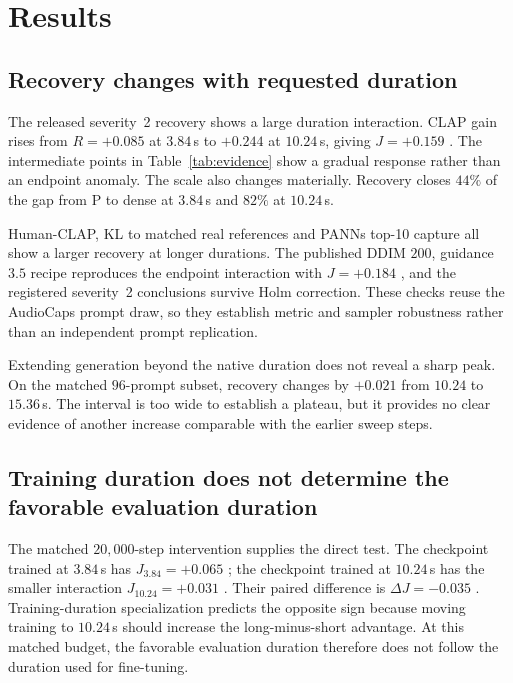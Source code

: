 \section{Results}
\subsection{Recovery changes with requested duration}
The released severity~2 recovery shows a large duration interaction. CLAP gain rises from $R=+0.085$  at $3.84$\,s to $+0.244$  at $10.24$\,s, giving $J=+0.159$ . The intermediate points in Table~\ref{tab:evidence} show a gradual response rather than an endpoint anomaly. The scale also changes materially. Recovery closes $44\%$ of the gap from P to dense at $3.84$\,s and $82\%$ at $10.24$\,s.

Human-CLAP, KL to matched real references and PANNs top-10 capture all show a larger recovery at longer durations. The published DDIM $200$, guidance $3.5$ recipe reproduces the endpoint interaction with $J=+0.184$ , and the registered severity~2 conclusions survive Holm correction. These checks reuse the AudioCaps prompt draw, so they establish metric and sampler robustness rather than an independent prompt replication.

Extending generation beyond the native duration does not reveal a sharp peak. On the matched $96$-prompt subset, recovery changes by $+0.021$  from $10.24$ to $15.36$\,s. The interval is too wide to establish a plateau, but it provides no clear evidence of another increase comparable with the earlier sweep steps.

\subsection{Training duration does not determine the favorable evaluation duration}
The matched $20{,}000$-step intervention supplies the direct test. The checkpoint trained at $3.84$\,s has $J_{3.84}=+0.065$ ; the checkpoint trained at $10.24$\,s has the smaller interaction $J_{10.24}=+0.031$ . Their paired difference is $\Delta J=-0.035$ . Training-duration specialization predicts the opposite sign because moving training to $10.24$\,s should increase the long-minus-short advantage. At this matched budget, the favorable evaluation duration therefore does not follow the duration used for fine-tuning.

